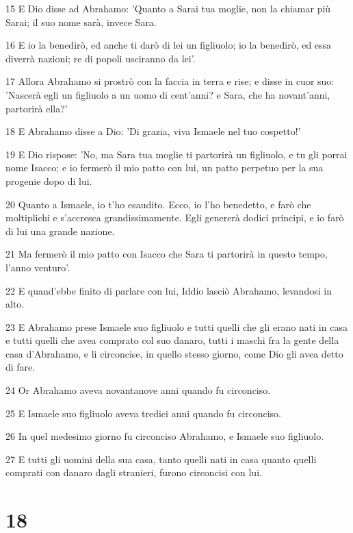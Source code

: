 \par 15 E Dio disse ad Abrahamo: 'Quanto a Sarai tua moglie, non la chiamar più Sarai; il suo nome sarà, invece Sara.
\par 16 E io la benedirò, ed anche ti darò di lei un figliuolo; io la benedirò, ed essa diverrà nazioni; re di popoli usciranno da lei'.
\par 17 Allora Abrahamo si prostrò con la faccia in terra e rise; e disse in cuor suo: 'Nascerà egli un figliuolo a un uomo di cent'anni? e Sara, che ha novant'anni, partorirà ella?'
\par 18 E Abrahamo disse a Dio: 'Di grazia, viva Ismaele nel tuo cospetto!'
\par 19 E Dio rispose: 'No, ma Sara tua moglie ti partorirà un figliuolo, e tu gli porrai nome Isacco; e io fermerò il mio patto con lui, un patto perpetuo per la sua progenie dopo di lui.
\par 20 Quanto a Ismaele, io t'ho esaudito. Ecco, io l'ho benedetto, e farò che moltiplichi e s'accresca grandissimamente. Egli genererà dodici principi, e io farò di lui una grande nazione.
\par 21 Ma fermerò il mio patto con Isacco che Sara ti partorirà in questo tempo, l'anno venturo'.
\par 22 E quand'ebbe finito di parlare con lui, Iddio lasciò Abrahamo, levandosi in alto.
\par 23 E Abrahamo prese Ismaele suo figliuolo e tutti quelli che gli erano nati in casa e tutti quelli che avea comprato col suo danaro, tutti i maschi fra la gente della casa d'Abrahamo, e li circoncise, in quello stesso giorno, come Dio gli avea detto di fare.
\par 24 Or Abrahamo aveva novantanove anni quando fu circonciso.
\par 25 E Ismaele suo figliuolo aveva tredici anni quando fu circonciso.
\par 26 In quel medesimo giorno fu circonciso Abrahamo, e Ismaele suo figliuolo.
\par 27 E tutti gli uomini della sua casa, tanto quelli nati in casa quanto quelli comprati con danaro dagli stranieri, furono circoncisi con lui.

\chapter{18}

